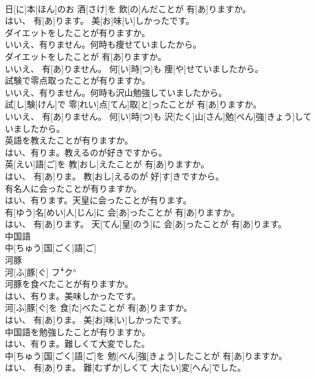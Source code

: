 \documentclass[8pt]{extreport}
\begin{document}
\begin{CJK}{UTF8}{min}
\\	日[に]本[ほん]のお 酒[さけ]を 飲[の]んだことが 有[あ]りますか。 
\\	はい、 有[あ]ります。 美[お]味[い]しかったです。
\\	ダイエットをしたことが有りますか。 
\\	いいえ、有りません。何時も痩せていましたから。	
\\	ダイエットをしたことが 有[あ]りますか。 
\\	いいえ、 有[あ]りません。 何[い]時[つ]も 痩[や]せていましたから。
\\	試験で零点取ったことが有りますか。 
\\	いいえ、有りません。何時も沢山勉強していましたから。	
\\	試[し]験[けん]で 零[れい]点[てん]取[と]ったことが 有[あ]りますか。 
\\	いいえ、 有[あ]りません。 何[い]時[つ]も 沢[たく]山[さん]勉[べん]強[きょう]していましたから。
\\	英語を教えたことが有りますか。 
\\	はい、有りま。教えるのが好きですから。	
\\	英[えい]語[ご]を 教[おし]えたことが 有[あ]りますか。 
\\	はい、 有[あ]りま。 教[おし]えるのが 好[す]きですから。
\\	有名人に会ったことが有りますか。 
\\	はい、有ります。天皇に会ったことが有ります。	
\\	有[ゆう]名[めい]人[じん]に 会[あ]ったことが 有[あ]りますか。 
\\	はい、 有[あ]ります。 天[てん]皇[のう]に 会[あ]ったことが 有[あ]ります。
\\	中国語	
\\	中[ちゅう]国[ごく]語[ご]
\\	河豚	
\\	河[ふ]豚[ぐ]	フꜜク°
\\	河豚を食べたことが有りますか。 
\\	はい、有りま。美味しかったです。	
\\	河[ふ]豚[ぐ]を 食[た]べたことが 有[あ]りますか。 
\\	はい、 有[あ]りま。 美[お]味[い]しかったです。
\\	中国語を勉強したことが有りますか。 
\\	はい、有りま。難しくて大変でした。	
\\	中[ちゅう]国[ごく]語[ご]を 勉[べん]強[きょう]したことが 有[あ]りますか。 
\\	はい、 有[あ]りま。 難[むずか]しくて 大[たい]変[へん]でした。

\end{CJK}
\end{document}
